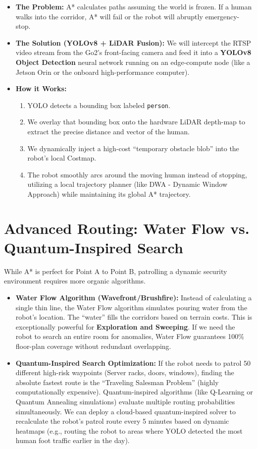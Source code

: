 \documentclass[12pt, a4paper]{article}
\begin{document}
\begin{itemize}
    \item \textbf{The Problem:} A* calculates paths assuming the world is frozen. If a human walks into the corridor, A* will fail or the robot will abruptly emergency-stop.
    \item \textbf{The Solution (YOLOv8 + LiDAR Fusion):} We will intercept the RTSP video stream from the Go2's front-facing camera and feed it into a \textbf{YOLOv8 Object Detection} neural network running on an edge-compute node (like a Jetson Orin or the onboard high-performance computer).
    \item \textbf{How it Works:}
    \begin{enumerate}
        \item YOLO detects a bounding box labeled \texttt{person}.
        \item We overlay that bounding box onto the hardware LiDAR depth-map to extract the precise distance and vector of the human.
        \item We dynamically inject a high-cost ``temporary obstacle blob'' into the robot's local Costmap.
        \item The robot smoothly arcs around the moving human instead of stopping, utilizing a local trajectory planner (like DWA - Dynamic Window Approach) while maintaining its global A* trajectory.
    \end{enumerate}
\end{itemize}

\section{Advanced Routing: Water Flow vs. Quantum-Inspired Search}
While A* is perfect for Point A to Point B, patrolling a dynamic security environment requires more organic algorithms.

\begin{itemize}
    \item \textbf{Water Flow Algorithm (Wavefront/Brushfire):} Instead of calculating a single thin line, the Water Flow algorithm simulates pouring water from the robot's location. The ``water'' fills the corridors based on terrain costs. This is exceptionally powerful for \textbf{Exploration and Sweeping}. If we need the robot to search an entire room for anomalies, Water Flow guarantees 100\% floor-plan coverage without redundant overlapping.
    \item \textbf{Quantum-Inspired Search Optimization:} If the robot needs to patrol 50 different high-risk waypoints (Server racks, doors, windows), finding the absolute fastest route is the ``Traveling Salesman Problem'' (highly computationally expensive). Quantum-inspired algorithms (like Q-Learning or Quantum Annealing simulations) evaluate multiple routing probabilities simultaneously. We can deploy a cloud-based quantum-inspired solver to recalculate the robot's patrol route every 5 minutes based on dynamic heatmaps (e.g., routing the robot to areas where YOLO detected the most human foot traffic earlier in the day).
\end{itemize}
\end{document}
